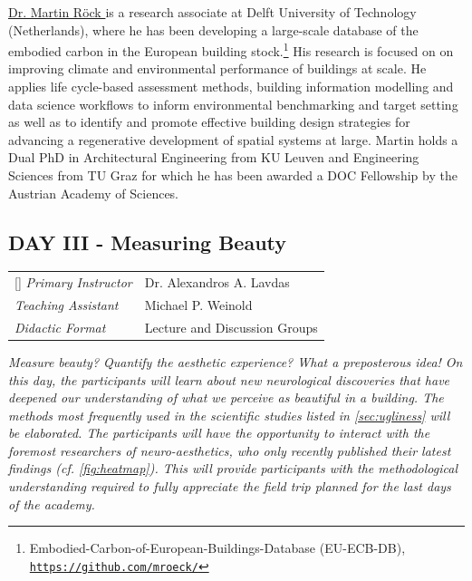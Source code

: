 \documentclass{article}
\begin{document}
\href{https://www.linkedin.com/in/martinroeck/}{Dr. Martin Röck \ExternalLink} is a research associate at Delft University of Technology (Netherlands), where he has been developing a large-scale database of the embodied carbon in the European building stock.\footnote{Embodied-Carbon-of-European-Buildings-Database (EU-ECB-DB), \href{https://github.com/mroeck/Embodied-Carbon-of-European-Buildings-Database}{\texttt{https://github.com/mroeck/}}} His research is focused on  on improving climate and environmental performance of buildings at scale. He applies life cycle-based assessment methods, building information modelling and data science workflows to inform environmental benchmarking and target setting as well as to identify and promote effective building design strategies for advancing a regenerative development of spatial systems at large. Martin holds a Dual PhD in Architectural Engineering from KU Leuven and Engineering Sciences from TU Graz for which he has been awarded a DOC Fellowship by the Austrian Academy of Sciences.

\subsection{DAY III - Measuring Beauty}
\label{subsec:day_3}

\begin{NiceTabular}{W{l}{3cm}l}[]
\textit{Primary Instructor} & Dr. Alexandros A. Lavdas \\
\textit{Teaching Assistant} & Michael P. Weinold \\
\textit{Didactic Format} & Lecture and Discussion Groups
\end{NiceTabular}

\textit{Measure beauty? Quantify the aesthetic experience? What a preposterous idea! On this day, the participants will learn about new neurological discoveries that have deepened our understanding of what we perceive as beautiful in a building. The methods most frequently used in the scientific studies listed in \cref{sec:ugliness} will be elaborated. The participants will have the opportunity to interact with the foremost researchers of neuro-aesthetics, who only recently published their latest findings (cf. \cref{fig:heatmap}). This will provide participants with the methodological understanding required to fully appreciate the field trip planned for the last days of the academy.}
\end{document}
